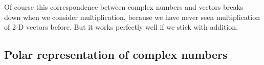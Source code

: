

Of course this correspondence between complex numbers and vectors breaks down when we consider multiplication, because we have never seen multiplication of 2-D vectors before. But it works perfectly well if we stick with addition.

\subsection{Polar representation of complex numbers}

